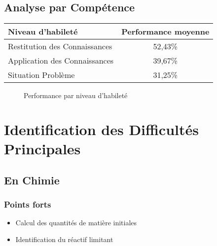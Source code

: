 \documentclass[12pt]{article}
\begin{document}
\subsection{Analyse par Compétence}

\begin{center}
\begin{tabular}{|l|c|}
\hline
\textbf{Niveau d'habileté} & \textbf{Performance moyenne} \\
\hline
Restitution des Connaissances & 52,43\% \\
Application des Connaissances & 39,67\% \\
Situation Problème & 31,25\% \\
\hline
\end{tabular}
\end{center}

\begin{figure}[H]
\centering
{}
\caption{Performance par niveau d'habileté}
\end{figure}

\section{Identification des Difficultés Principales}

\subsection{En Chimie}

\subsubsection{Points forts}
\begin{itemize}
\item Calcul des quantités de matière initiales
\item Identification du réactif limitant
\end{itemize}
\end{document}

